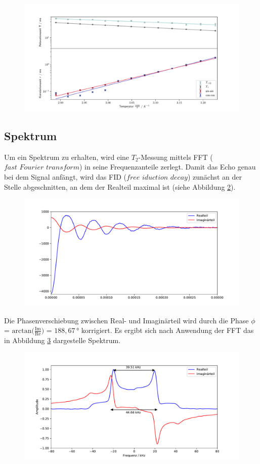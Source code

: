 \begin{figure}[H]
    \centering
    \includegraphics[width=\textwidth]{Auswertung/Tempabh/Korr_Temp.pdf}
    \caption{}
    \label{fig:korrtemp}
\end{figure}

\subsection{Spektrum}
\label{sec:spektr}
Um ein Spektrum zu erhalten, wird eine $T_2$-Messung mittels FFT
($\textit{fast Fourier transform}$) in seine Frequenzanteile zerlegt.
Damit das Echo genau bei dem Signal anfängt, wird das FID
($\textit{free iduction decay}$) zunächst an der Stelle abgeschnitten, an dem der
Realteil maximal ist (siehe Abbildung \ref{fig:fid}).

\begin{figure}[H]
    \centering
    \includegraphics[width=\textwidth]{Auswertung/Spek/FID.pdf}
    \caption{}
    \label{fig:fid}
\end{figure}
\noindent
Die Phasenverschiebung zwischen Real- und Imaginärteil wird durch die Phase $\phi$ =
$\text{arctan}\biggl(\frac{\text{Im}}{\text{Re}}\biggr)$ = $188,67\,°$ korrigiert.
Es ergibt sich nach Anwendung der FFT das in Abbildung \ref{fig:spekt} dargestelle
Spektrum.

\begin{figure}[H]
    \centering
    \includegraphics[width=\textwidth]{Auswertung/Spek/Spek.pdf}
    \caption{}
    \label{fig:spekt}
\end{figure}
